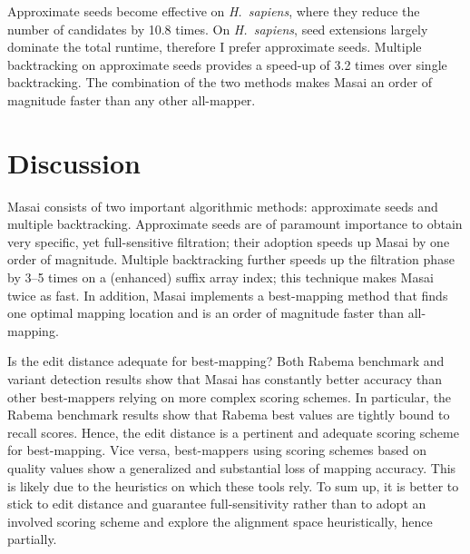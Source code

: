 Approximate seeds become effective on \emph{H.~sapiens}, where they reduce the number of candidates by 10.8 times. 
On \emph{H.~sapiens}, seed extensions largely dominate the total runtime, therefore I prefer approximate seeds.
Multiple backtracking on approximate seeds provides a speed-up of 3.2 times over single backtracking.
The combination of the two methods makes Masai an order of magnitude faster than any other all-mapper.

\begin{table*}[b]
  \center
  \caption[Masai filtration efficiency results]{
    \label{tab:masai:filtration}%
    Masai all-mapping filtration efficiency results.
    Filtering times include seeds indexing times.
    The best filtering schemes are in bold.
  }
  \resizebox{\textwidth}{!}
  {
  \sffamily
  \small
  \renewcommand{\tabcolsep}{0.8ex}
  
  }
  \vspace{2mm}
\end{table*}


\section{Discussion}

Masai consists of two important algorithmic methods: approximate seeds and multiple backtracking.
Approximate seeds are of paramount importance to obtain very specific, yet full-sensitive filtration; their adoption speeds up Masai by one order of magnitude.
Multiple backtracking further speeds up the filtration phase by 3--5 times on a (enhanced) suffix array index; this technique makes Masai twice as fast.
In addition, Masai implements a best-mapping method that finds one optimal mapping location and is an order of magnitude faster than all-mapping.

Is the edit distance adequate for best-mapping?
Both Rabema benchmark and variant detection results show that Masai has constantly better accuracy than other best-mappers relying on more complex scoring schemes.
In particular, the Rabema benchmark results show that Rabema best values are tightly bound to recall scores.
Hence, the edit distance is a pertinent and adequate scoring scheme for best-mapping.
Vice versa, best-mappers using scoring schemes based on quality values show a generalized and substantial loss of mapping accuracy.
This is likely due to the heuristics on which these tools rely.
To sum up, it is better to stick to edit distance and guarantee full-sensitivity rather than to adopt an involved scoring scheme and explore the alignment space heuristically, hence partially.

